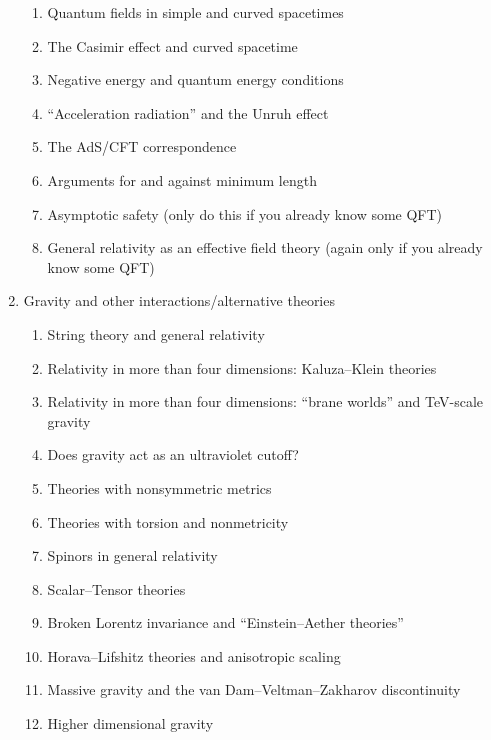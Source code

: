 \begin{enumerate}
\begin{enumerate}
  \item Quantum fields in simple and curved spacetimes
  \item The Casimir effect and curved spacetime
  \item Negative energy and quantum energy conditions
  \item ``Acceleration radiation'' and the Unruh effect
  \item The AdS/CFT correspondence
  \item Arguments for and against minimum length
  \item Asymptotic safety (only do this if you already know some QFT)
  \item General relativity as an effective field theory (again only if
    you already know some QFT)
  \end{enumerate}
\item Gravity and other interactions/alternative theories
  \begin{enumerate}
  \item String theory and general relativity
  \item Relativity in more than four dimensions: Kaluza--Klein theories
  \item Relativity in more than four dimensions: ``brane worlds'' and
    TeV-scale gravity
  \item Does gravity act as an ultraviolet cutoff?
  \item Theories with nonsymmetric metrics
  \item Theories with torsion and nonmetricity
  \item Spinors in general relativity
  \item Scalar--Tensor theories
  \item Broken Lorentz invariance and ``Einstein--Aether theories''
  \item Horava--Lifshitz theories and anisotropic scaling
  \item Massive gravity and the van Dam--Veltman--Zakharov discontinuity
  \item Higher dimensional gravity
  \end{enumerate}
\end{enumerate}
